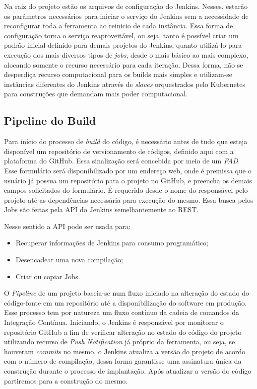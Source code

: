 Na raiz do projeto estão os arquivos de configuração do Jenkins. Nesses, estarão os parâmetros necessários para iniciar o serviço do Jenkins sem a necessidade de reconfigurar toda a ferramenta ao reinicio de cada instância. Essa forma de configuração torna o serviço reaproveitável, ou seja, tanto é possível criar um padrão inicial definido para demais projetos do Jenkins, quanto utilizá-lo para execução dos mais diversos tipos de\textit{ jobs}, desde o mais básico ao mais complexo, alocando somente o recurso necessário para cada iteração. Dessa forma, não se desperdiça recurso computacional para os builds mais simples e utilizam-se instâncias diferentes do Jenkins através de \textit{slaves} orquestrados pelo Kubernetes para construções que demandam mais poder computacional.
    \vspace*{0.5cm}

\subsection{Pipeline do Build}\label{subsection:pipebuild}

Para início do processo de \textit{build} do código, é necessário antes de tudo que esteja disponível um repositório de versionamento de códigos, definido aqui com a plataforma do GitHub. Essa sinalização será concebida por meio de um \textit{FAD}. Esse formulário será disponibilizado por um endereço web, onde é premissa que o usuário já possua um repositório para o projeto no GitHub, e preencha os demais campos solicitados do formulário. É requerido desde o nome do responsável pelo projeto até as dependências necessária para execução do mesmo. Essa busca pelos Jobs são feitas pela API do Jenkins semelhantemente ao REST.

Nesse sentido a API pode ser usada para:

\begin{itemize}
	\item Recuperar informações de Jenkins para consumo programático;
	\item Desencadear uma nova compilação;
	\item Criar ou copiar Jobs.
\end{itemize}


O \textit{Pipeline }de um projeto baseia-se num fluxo iniciado na alteração do estado do código-fonte em um repositório até a disponibilização do software em produção. Esse processo tem por natureza um fluxo contínuo da cadeia de comandos da Integração Contínua. Iniciando, o Jenkins é responsável por monitorar o repositório GitHub a fim de verificar alteração no estado do código do projeto utilizando recurso de \textit{Push Notification} já próprio da ferramenta, ou seja, se houveram \textit{commits} no mesmo, o Jenkins atualiza a versão do projeto de acordo com o número de compilação, dessa forma garantisse uma assinatura única da construção durante o processo de implantação. Após atualizar a versão do código partiremos para a construção do mesmo.

